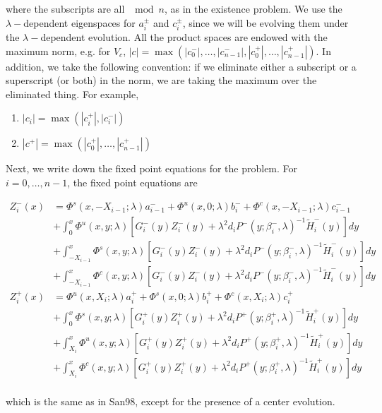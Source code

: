 \documentclass[12pt]{article}
\begin{document}
where the subscripts are all $\mod n$, as in the existence problem. We use the $\lambda-$dependent eigenspaces for $a_i^\pm$ and $c_i^\pm$, since we will be evolving them under the $\lambda-$dependent evolution. All the product spaces are endowed with the maximum norm, e.g. for $V_c$, $|c| = \max(|c_0^-|, \dots, |c_{n-1}^-|, |c_0^+|, \dots, |c_{n-1}^+|)$. In addition, we take the following convention: if we eliminate either a subscript or a superscript (or both) in the norm, we are taking the maximum over the eliminated thing. For example,
\begin{enumerate}
	\item $|c_i| = \max(|c_i^+|, |c_i^-|)$ 
	\item $|c^+| = \max(|c_0^+|, \dots, |c_{n-1}^+|)$
\end{enumerate}

Next, we write down the fixed point equations for the problem. For $i = 0, \dots, n-1$, the fixed point equations are

\begin{align*}
Z_i^-(x) &= \Phi^s(x, -X_{i-1}; \lambda) a_{i-1}^- + \Phi^u(x, 0; \lambda) b_i^- + \Phi^c(x, -X_{i-1}; \lambda) c_{i-1}^- \\
&+ \int_0^x \Phi^u(x, y; \lambda) [G_i^-(y)Z_i^-(y) + \lambda^2 d_i P^-(y; \beta_i^-, \lambda)^{-1} \tilde{H}_i^-(y)] dy \\
&+ \int_{-X_{i-1}}^x \Phi^s(x, y; \lambda) [G_i^-(y)Z_i^-(y) + \lambda^2 d_i P^-(y; \beta_i^-, \lambda)^{-1} \tilde{H}_i^-(y)] dy \\
&+ \int_{-X_{i-1}}^x \Phi^c(x, y; \lambda) [G_i^-(y)Z_i^-(y) + \lambda^2 d_i P^-(y; \beta_i^-, \lambda)^{-1} \tilde{H}_i^-(y)] dy  \\ 
Z_i^+(x) &= \Phi^u(x, X_i; \lambda) a_i^+ + \Phi^s(x, 0; \lambda) b_i^+ + \Phi^c(x, X_i; \lambda) c_i^+ \\
&+ \int_0^x \Phi^s(x, y; \lambda) [G_i^+(y)Z_i^+(y) + \lambda^2 d_i P^+(y; \beta_i^+, \lambda)^{-1} \tilde{H}_i^+(y) ] dy \\
&+ \int_{X_i}^x \Phi^u(x, y; \lambda) [G_i^+(y)Z_i^+(y) + \lambda^2 d_i P^+(y; \beta_i^+, \lambda)^{-1} \tilde{H}_i^+(y) ] dy \\
&+ \int_{X_i}^x \Phi^c(x, y; \lambda) [G_i^+(y)Z_i^+(y) + \lambda^2 d_i P^+(y; \beta_i^+, \lambda)^{-1} \tilde{H}_i^+(y) ] dy \\
\end{align*}

which is the same as in San98, except for the presence of a center evolution.
\end{document}
